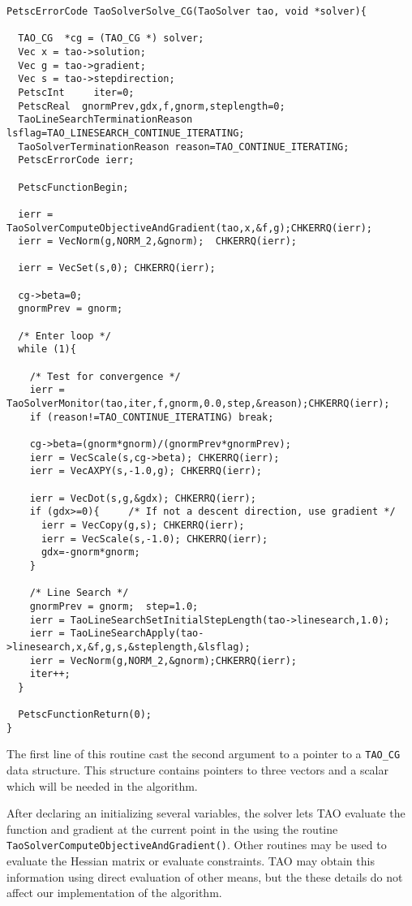\begin{verbatim}
PetscErrorCode TaoSolverSolve_CG(TaoSolver tao, void *solver){

  TAO_CG  *cg = (TAO_CG *) solver;
  Vec x = tao->solution;
  Vec g = tao->gradient;
  Vec s = tao->stepdirection;
  PetscInt     iter=0;
  PetscReal  gnormPrev,gdx,f,gnorm,steplength=0;
  TaoLineSearchTerminationReason lsflag=TAO_LINESEARCH_CONTINUE_ITERATING;
  TaoSolverTerminationReason reason=TAO_CONTINUE_ITERATING;
  PetscErrorCode ierr;

  PetscFunctionBegin;

  ierr = TaoSolverComputeObjectiveAndGradient(tao,x,&f,g);CHKERRQ(ierr);
  ierr = VecNorm(g,NORM_2,&gnorm);  CHKERRQ(ierr);

  ierr = VecSet(s,0); CHKERRQ(ierr); 

  cg->beta=0;
  gnormPrev = gnorm;

  /* Enter loop */
  while (1){

    /* Test for convergence */
    ierr = TaoSolverMonitor(tao,iter,f,gnorm,0.0,step,&reason);CHKERRQ(ierr);
    if (reason!=TAO_CONTINUE_ITERATING) break;

    cg->beta=(gnorm*gnorm)/(gnormPrev*gnormPrev);
    ierr = VecScale(s,cg->beta); CHKERRQ(ierr);
    ierr = VecAXPY(s,-1.0,g); CHKERRQ(ierr);
    
    ierr = VecDot(s,g,&gdx); CHKERRQ(ierr);
    if (gdx>=0){     /* If not a descent direction, use gradient */
      ierr = VecCopy(g,s); CHKERRQ(ierr);
      ierr = VecScale(s,-1.0); CHKERRQ(ierr);
      gdx=-gnorm*gnorm;
    } 

    /* Line Search */
    gnormPrev = gnorm;  step=1.0;
    ierr = TaoLineSearchSetInitialStepLength(tao->linesearch,1.0);
    ierr = TaoLineSearchApply(tao->linesearch,x,&f,g,s,&steplength,&lsflag);
    ierr = VecNorm(g,NORM_2,&gnorm);CHKERRQ(ierr);
    iter++;
  }
  
  PetscFunctionReturn(0);
}
\end{verbatim}

The first line of this routine cast the second argument to a pointer
to a {\tt TAO\_CG} data structure.  This structure contains pointers
to three vectors and a scalar which will be needed in the algorithm.

After declaring an initializing several variables, the solver lets TAO 
evaluate the function and gradient at the
current point in the using the routine 
{\tt TaoSolverComputeObjectiveAndGradient()}.
Other routines may be used to evaluate the Hessian matrix or evaluate
constraints.  TAO may obtain this information using direct evaluation 
of other means, but the these details do not affect our implementation
of the algorithm.

